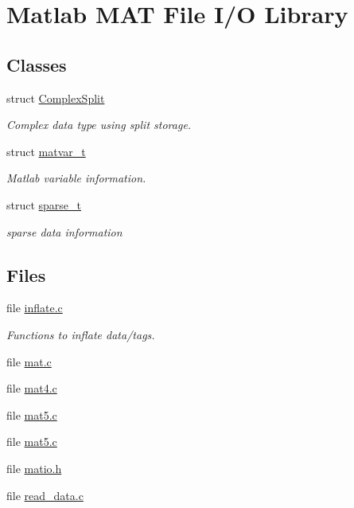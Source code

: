 \hypertarget{group__MAT}{
\section{Matlab MAT File I/O Library}
\label{group__MAT}
}
\subsection*{Classes}
\begin{DoxyCompactItemize}
\item 
struct \hyperlink{structComplexSplit}{ComplexSplit}
\begin{DoxyCompactList}\small\item\em Complex data type using split storage. \item\end{DoxyCompactList}\item 
struct \hyperlink{structmatvar__t}{matvar\_\-t}
\begin{DoxyCompactList}\small\item\em Matlab variable information. \item\end{DoxyCompactList}\item 
struct \hyperlink{structsparse__t}{sparse\_\-t}
\begin{DoxyCompactList}\small\item\em sparse data information \item\end{DoxyCompactList}\end{DoxyCompactItemize}
\subsection*{Files}
\begin{DoxyCompactItemize}
\item 
file \hyperlink{inflate_8c}{inflate.c}


\begin{DoxyCompactList}\small\item\em Functions to inflate data/tags. \item\end{DoxyCompactList}

\item 
file \hyperlink{mat_8c}{mat.c}
\item 
file \hyperlink{mat4_8c}{mat4.c}
\item 
file \hyperlink{mat5_8c}{mat5.c}
\item 
file \hyperlink{mat5_8c}{mat5.c}
\item 
file \hyperlink{matio_8h}{matio.h}
\item 
file \hyperlink{read__data_8c}{read\_\-data.c}
\end{DoxyCompactItemize}
